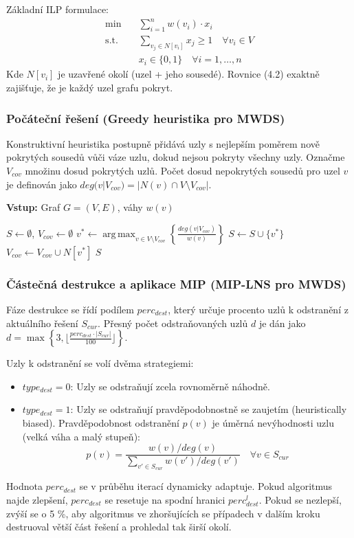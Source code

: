 \documentclass[12pt,a4paper]{article}
\theoremstyle{definition}
\begin{document}
Základní ILP formulace:
\begin{align}
\min \quad & \sum_{i=1}^{n} w(v_i) \cdot x_i \\
\text{s.t.} \quad & \sum_{v_j \in N[v_i]} x_j \ge 1 \quad \forall v_i \in V \\
& x_i \in \{0,1\} \quad \forall i=1, \dots, n
\end{align}
Kde $N[v_i]$ je uzavřené okolí (uzel + jeho sousedé). Rovnice (4.2) exaktně zajišťuje, že je každý uzel grafu pokryt.

\subsubsection{Počáteční řešení (Greedy heuristika pro MWDS)}
Konstruktivní heuristika postupně přidává uzly s nejlepším poměrem nově pokrytých sousedů vůči váze uzlu, dokud nejsou pokryty všechny uzly. Označme $V_{cov}$ množinu dosud pokrytých uzlů. Počet dosud nepokrytých sousedů pro uzel $v$ je definován jako $deg(v | V_{cov}) = |N(v) \cap V \setminus V_{cov}|$.

\begin{algorithm}[H]
\caption{Greedy Heuristic for MWDS}
\textbf{Vstup:} Graf $G = (V,E)$, váhy $w(v)$
\begin{algorithmic}[1]
\STATE $S \gets \emptyset$, $V_{cov} \gets \emptyset$
    \STATE $v^* \gets \operatorname{arg\,max}_{v \in V \setminus V_{cov}} \left\{ \frac{deg(v | V_{cov})}{w(v)} \right\}$
    \STATE $S \gets S \cup \{v^*\}$
    \STATE $V_{cov} \gets V_{cov} \cup N[v^*]$
\ENDWHILE
\RETURN $S$
\end{algorithmic}
\end{algorithm}

\subsubsection{Částečná destrukce a aplikace MIP (MIP-LNS pro MWDS)}
Fáze destrukce se řídí podílem $perc_{dest}$, který určuje procento uzlů k odstranění z aktuálního řešení $S_{cur}$. Přesný počet odstraňovaných uzlů $d$ je dán jako $d = \max\left\{3, \lfloor \frac{perc_{dest} \cdot |S_{cur}|}{100} \rfloor\right\}$.

Uzly k odstranění se volí dvěma strategiemi:
\begin{itemize}
    \item $type_{dest} = 0$: Uzly se odstraňují zcela rovnoměrně náhodně.
    \item $type_{dest} = 1$: Uzly se odstraňují pravděpodobnostně se zaujetím (heuristically biased). Pravděpodobnost odstranění $p(v)$ je úměrná nevýhodnosti uzlu (velká váha a malý stupeň):
    \begin{equation}
        p(v) = \frac{w(v) / deg(v)}{\sum_{v' \in S_{cur}} w(v') / deg(v')} \quad \forall v \in S_{cur} \text{}
    \end{equation}
\end{itemize}
Hodnota $perc_{dest}$ se v průběhu iterací dynamicky adaptuje. Pokud algoritmus najde zlepšení, $perc_{dest}$ se resetuje na spodní hranici $perc_{dest}^l$. Pokud se nezlepší, zvýší se o 5 \%, aby algoritmus ve zhoršujících se případech v dalším kroku destruoval větší část řešení a prohledal tak širší okolí. 
\end{document}
